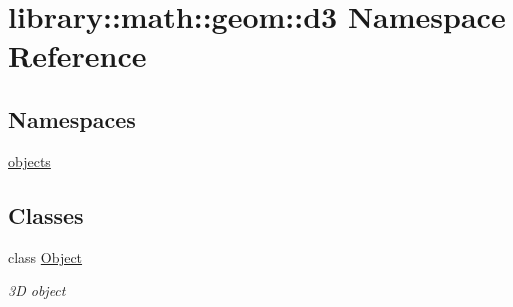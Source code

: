 \hypertarget{namespacelibrary_1_1math_1_1geom_1_1d3}{}\section{library\+:\+:math\+:\+:geom\+:\+:d3 Namespace Reference}
\label{namespacelibrary_1_1math_1_1geom_1_1d3}
\subsection*{Namespaces}
\begin{DoxyCompactItemize}
\item 
 \hyperlink{namespacelibrary_1_1math_1_1geom_1_1d3_1_1objects}{objects}
\end{DoxyCompactItemize}
\subsection*{Classes}
\begin{DoxyCompactItemize}
\item 
class \hyperlink{classlibrary_1_1math_1_1geom_1_1d3_1_1_object}{Object}
\begin{DoxyCompactList}\small\item\em 3D object \end{DoxyCompactList}\end{DoxyCompactItemize}
